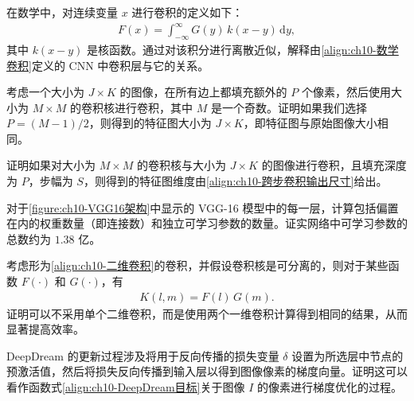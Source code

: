 \documentclass[../../main.tex]{subfiles}
\begin{document}
\begin{exercise}[$\star$]\label{exercise:ch10-05}
在数学中，对连续变量 $x$ 进行卷积的定义如下：
\begin{align}
  F(x)=\int_{-\infty}^{\infty}G(y)\,k(x-y)\,\mathrm{d}y,
  \label{align:ch10-连续卷积}
\end{align}
其中 $k(x-y)$ 是核函数。通过对该积分进行离散近似，解释由\eqref{align:ch10-数学卷积}定义的 CNN 中卷积层与它的关系。
\end{exercise}

\begin{exercise}[$\star$]\label{exercise:ch10-06}
考虑一个大小为 $J\times K$ 的图像，在所有边上都填充额外的 $P$ 个像素，然后使用大小为 $M\times M$ 的卷积核进行卷积，其中 $M$ 是一个奇数。证明如果我们选择 $P=(M-1)/2$，则得到的特征图大小为 $J\times K$，即特征图与原始图像大小相同。
\end{exercise}

\begin{exercise}[$\star$]\label{exercise:ch10-07}
证明如果对大小为 $M\times M$ 的卷积核与大小为 $J\times K$ 的图像进行卷积，且填充深度为 $P$，步幅为 $S$，则得到的特征图维度由\eqref{align:ch10-跨步卷积输出尺寸}给出。
\end{exercise}

\begin{exercise}[$\star\star$]\label{exercise:ch10-08}
对于\cref{figure:ch10-VGG16架构}中显示的 VGG-16 模型中的每一层，计算包括偏置在内的权重数量（即连接数）和独立可学习参数的数量。证实网络中可学习参数的总数约为 $1.38$ 亿。
\end{exercise}

\begin{exercise}[$\star\star$]\label{exercise:ch10-09}
考虑形为\eqref{align:ch10-二维卷积}的卷积，并假设卷积核是可分离的，则对于某些函数 $F(\cdot)$ 和 $G(\cdot)$，有
\begin{align}
  K(l,m)=F(l)\,G(m).
  \label{align:ch10-可分离核}
\end{align}
证明可以不采用单个二维卷积，而是使用两个一维卷积计算得到相同的结果，从而显著提高效率。
\end{exercise}

\begin{exercise}[$\star$]\label{exercise:ch10-10}
DeepDream 的更新过程涉及将用于反向传播的损失变量 $\delta$ 设置为所选层中节点的预激活值，然后将损失反向传播到输入层以得到图像像素的梯度向量。证明这可以看作函数式\eqref{align:ch10-DeepDream目标}关于图像 $I$ 的像素进行梯度优化的过程。
\end{exercise}
\end{document}
